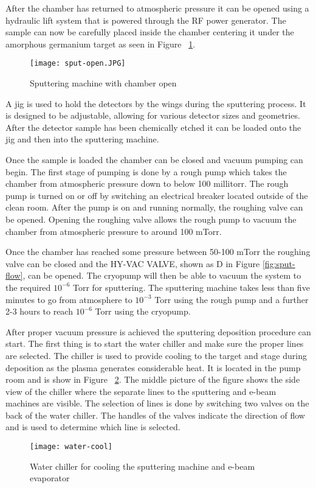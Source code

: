After the chamber has returned to atmospheric pressure it can be opened using a hydraulic lift system that is powered through the RF power generator.
The sample can now be carefully placed inside the chamber centering it under the amorphous germanium target as seen in Figure ~\ref{fig:sput-open}.
\begin{figure}[htpb]
\centering
\texttt{[image: sput-open.JPG]}
\caption{Sputtering machine with chamber open}
\label{fig:sput-open}
\end{figure}
A jig is used to hold the detectors by the wings during the sputtering process.
It is designed to be adjustable, allowing for various detector sizes and geometries.
After the detector sample has been chemically etched it can be loaded onto the jig and then into the sputtering machine.

Once the sample is loaded the chamber can be closed and vacuum pumping can begin.
The first stage of pumping is done by a rough pump which takes the chamber from atmospheric pressure down to below 100 millitorr.
The rough pump is turned on or off by switching an electrical breaker located outside of the clean room.
After the pump is on and running normally, the roughing valve can be opened.
Opening the roughing valve allows the rough pump to vacuum the chamber from atmospheric pressure to around 100 mTorr.

Once the chamber has reached some pressure between 50-100 mTorr the roughing valve can be closed and the HY-VAC VALVE, shown as D in Figure \ref{fig:sput-flow}, can be opened.
The cryopump will then be able to vacuum the system to the required $10^{-6}$ Torr for sputtering.
The sputtering machine takes less than five minutes to go from atmosphere to $10^{-3}$ Torr using the rough pump and a further 2-3 hours to reach $10^{-6}$ Torr using the cryopump.

After proper vacuum pressure is achieved the sputtering deposition procedure can start.
The first thing is to start the water chiller and make sure the proper lines are selected.
The chiller is used to provide cooling to the target and stage during deposition as the plasma generates considerable heat.
It is located in the pump room and is show in Figure ~\ref{fig:water-cool}.
The middle picture of the figure shows the side view of the chiller where the separate lines to the sputtering and e-beam machines are visible.
The selection of lines is done by switching two valves on the back of the water chiller.
The handles of the valves indicate the direction of flow and is used to determine which line is selected.
\begin{figure}[htpb]
\centering
\texttt{[image: water-cool]}
\caption{Water chiller for cooling the sputtering machine and e-beam evaporator}
\label{fig:water-cool}
\end{figure}

